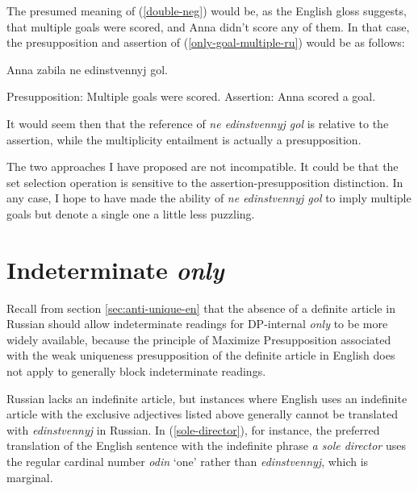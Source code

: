 \documentclass{article}
\begin{document}
\begin{exe}
\end{exe}

The presumed meaning of (\ref{double-neg}) would be, as the English gloss suggests, that multiple goals were scored, and Anna didn't score any of them. In that case, the presupposition and assertion of (\ref{only-goal-multiple-ru}) would be as follows:

\begin{exe}
	\ex Anna zabila ne edinstvennyj gol. \begin{xlist}
		\ex Presupposition: Multiple goals were scored.
		\ex Assertion: Anna scored a goal.
	\end{xlist}
\end{exe}

It would seem then that the reference of \textit{ne edinstvennyj gol} is relative to the assertion, while the multiplicity entailment is actually a presupposition.

The two approaches I have proposed are not incompatible. It could be that the set selection operation is sensitive to the assertion-presupposition distinction. In any case, I hope to have made the ability of \textit{ne edinstvennyj gol} to imply multiple goals but denote a single one a little less puzzling.


\section{Indeterminate \textit{only} \label{sec:indet}}
Recall from section \ref{sec:anti-unique-en} that the absence of a definite article in Russian should allow indeterminate readings for DP-internal \textit{only} to be more widely available, because the principle of Maximize Presupposition associated with the weak uniqueness presupposition of the definite article in English does not apply to generally block indeterminate readings.

Russian lacks an indefinite article, but instances where English uses an indefinite article with the exclusive adjectives listed above generally cannot be translated with \textit{edinstvennyj} in Russian. In (\ref{sole-director}), for instance, the preferred translation of the English sentence with the indefinite phrase \textit{a sole director} uses the regular cardinal number \textit{odin} `one' rather than \textit{edinstvennyj}, which is marginal.
\end{document}
